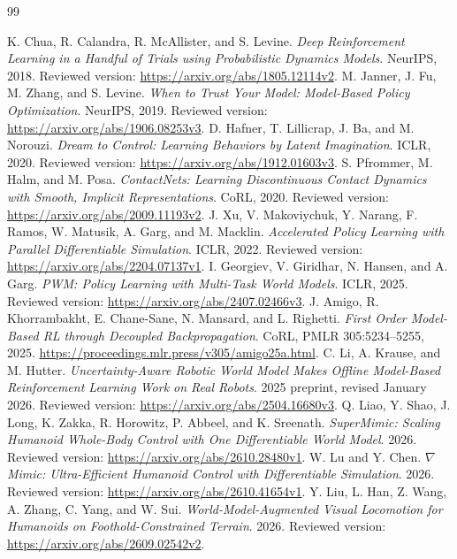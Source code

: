 \begin{thebibliography}{99}
\raggedright
{}
 K. Chua, R. Calandra, R. McAllister, and S. Levine.
\emph{Deep Reinforcement Learning in a Handful of Trials using Probabilistic Dynamics Models}.
NeurIPS, 2018. Reviewed version: \url{https://arxiv.org/abs/1805.12114v2}.
 M. Janner, J. Fu, M. Zhang, and S. Levine.
\emph{When to Trust Your Model: Model-Based Policy Optimization}.
NeurIPS, 2019. Reviewed version: \url{https://arxiv.org/abs/1906.08253v3}.
 D. Hafner, T. Lillicrap, J. Ba, and M. Norouzi.
\emph{Dream to Control: Learning Behaviors by Latent Imagination}.
ICLR, 2020. Reviewed version: \url{https://arxiv.org/abs/1912.01603v3}.
 S. Pfrommer, M. Halm, and M. Posa.
\emph{ContactNets: Learning Discontinuous Contact Dynamics with Smooth, Implicit Representations}.
CoRL, 2020. Reviewed version: \url{https://arxiv.org/abs/2009.11193v2}.
 J. Xu, V. Makoviychuk, Y. Narang, F. Ramos, W. Matusik, A. Garg,
and M. Macklin. \emph{Accelerated Policy Learning with Parallel Differentiable Simulation}.
ICLR, 2022. Reviewed version: \url{https://arxiv.org/abs/2204.07137v1}.
 I. Georgiev, V. Giridhar, N. Hansen, and A. Garg.
\emph{PWM: Policy Learning with Multi-Task World Models}.
ICLR, 2025. Reviewed version: \url{https://arxiv.org/abs/2407.02466v3}.
 J. Amigo, R. Khorrambakht, E. Chane-Sane, N. Mansard, and L. Righetti.
\emph{First Order Model-Based RL through Decoupled Backpropagation}.
CoRL, PMLR 305:5234--5255, 2025.
\url{https://proceedings.mlr.press/v305/amigo25a.html}.
 C. Li, A. Krause, and M. Hutter.
\emph{Uncertainty-Aware Robotic World Model Makes Offline Model-Based Reinforcement Learning Work on Real Robots}.
2025 preprint, revised January 2026. Reviewed version:
\url{https://arxiv.org/abs/2504.16680v3}.
 Q. Liao, Y. Shao, J. Long, K. Zakka, R. Horowitz,
P. Abbeel, and K. Sreenath.
\emph{SuperMimic: Scaling Humanoid Whole-Body Control with One Differentiable World Model}.
2026. Reviewed version: \url{https://arxiv.org/abs/2610.28480v1}.
 W. Lu and Y. Chen.
\emph{$\nabla$Mimic: Ultra-Efficient Humanoid Control with Differentiable Simulation}.
2026. Reviewed version: \url{https://arxiv.org/abs/2610.41654v1}.
 Y. Liu, L. Han, Z. Wang, A. Zhang, C. Yang, and W. Sui.
\emph{World-Model-Augmented Visual Locomotion for Humanoids on Foothold-Constrained Terrain}.
2026. Reviewed version: \url{https://arxiv.org/abs/2609.02542v2}.
\end{thebibliography}

